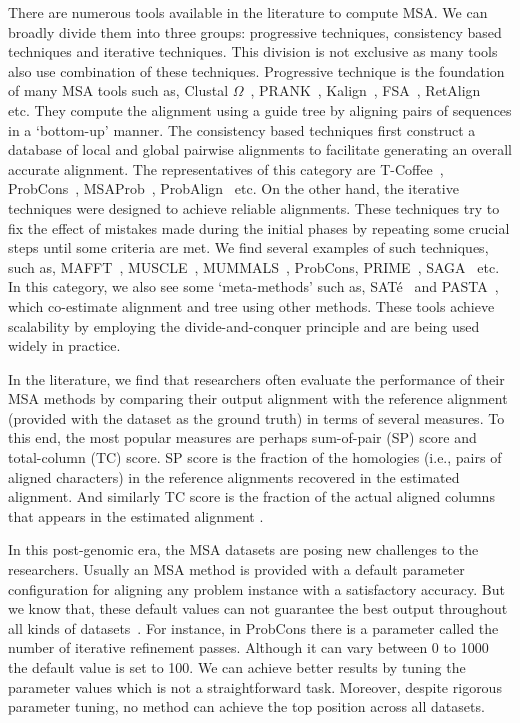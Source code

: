 There are numerous tools available in the literature to compute MSA. We can broadly divide them into three groups: progressive techniques, consistency based techniques and iterative techniques. This division is not exclusive as many tools also use combination of these techniques. Progressive technique is the foundation of many MSA tools such as, Clustal $\Omega$~\citep{sievers2011fast}, PRANK~\citep{loytynoja2005algorithm}, Kalign~\citep{lassmann2008kalign2}, FSA~\citep{bradley2009fast}, RetAlign~\citep{szabo2010reticular} etc. They compute the alignment using a guide tree by aligning pairs of sequences in a `bottom-up' manner. The consistency based techniques first construct a database of  local and global pairwise alignments to facilitate generating an overall accurate alignment. The representatives of this category are T-Coffee~\citep{notredame2000t}, ProbCons~\citep{do2005probcons}, MSAProb~\citep{liu2010msaprobs}, ProbAlign~\citep{roshan2006probalign} etc. On the other hand, the iterative techniques were designed to achieve reliable alignments. These techniques try to fix the effect of mistakes made during the initial phases by repeating some crucial steps until some criteria are met. We find several examples of such techniques, such as, MAFFT~\citep{katoh2002mafft}, MUSCLE~\citep{edgar2004muscle}, MUMMALS~\citep{pei2006mummals}, ProbCons, PRIME~\citep{yamada2006improvement}, SAGA~\citep{notredame1996saga} etc. In this category, we also see some `meta-methods' such as, SAT\'e~\citep{liu2009rapid} and PASTA~\citep{mirarab2015pasta}, which co-estimate alignment and tree using other methods. These tools achieve scalability by employing the divide-and-conquer principle and are being used widely in practice.

In the literature, we find that researchers often evaluate the performance of their MSA methods by comparing their output alignment with the reference alignment (provided with the dataset as the ground truth) in terms of several measures. To this end, the most popular measures are perhaps sum-of-pair (SP) score and total-column (TC) score. SP score is the fraction of the homologies (i.e., pairs of aligned characters) in the reference alignments recovered in the estimated alignment. And similarly TC score is the fraction of the actual aligned columns that appears in the estimated alignment .

In this post-genomic era, the MSA datasets are posing new challenges to the researchers. Usually an MSA method is provided with a default parameter configuration for aligning any problem instance with a satisfactory accuracy. But we know that, these default values can not guarantee the best output throughout all kinds of datasets~\citep{rubio2018characteristic}. For instance, in ProbCons there is a parameter called the number of iterative refinement passes. Although it can vary between 0 to 1000 the default value is set to 100. We can achieve better results by tuning the parameter values which is not a straightforward task. Moreover, despite rigorous parameter tuning, no method can achieve the top position across all datasets. 

